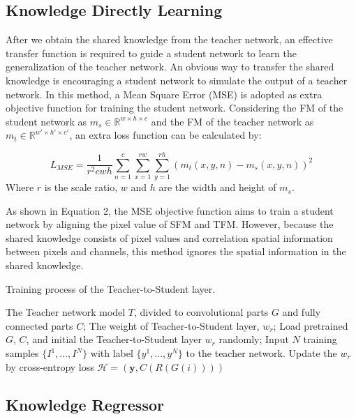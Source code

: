 \documentclass[letterpaper]{article} %
\begin{document}
\subsection{Knowledge Directly Learning}

After we obtain the shared knowledge from the teacher network, an effective transfer function is required to guide a student network to learn the generalization of the teacher network. An obvious way to transfer the shared knowledge is encouraging a student network to simulate the output of a teacher network. In this method, a Mean Square Error (MSE) is adopted as extra objective function for training the student network. Considering the FM of the student network as $m_{s}\in\mathbb{R}^{w\times h\times c}$ and the FM of the teacher network as $m_{t}\in\mathbb{R}^{w'\times h'\times c'}$, an extra loss function can be calculated by:

\begin{equation}
L_{MSE}=\frac{1}{r^2cwh}\sum_{n=1}^{c}\sum_{x=1}^{rw}\sum_{y=1}^{rh}(m_{t}(x,y,n)-m_{s}(x,y,n))^2
\end{equation}
Where $r$ is the scale ratio, $w$ and $h$ are the width and height of $m_{s}$.

As shown in Equation 2, the MSE objective function aims to train a student network by aligning the pixel value of SFM and TFM. However, because the shared knowledge consists of pixel values and correlation spatial information between pixels and channels, this method ignores the spatial information in the shared knowledge.

\begin{algorithm}[htb!]
	\caption{Training process of the Teacher-to-Student layer.}
	\begin{algorithmic}[1]
		\Require
		The Teacher network model $T$, divided to convolutional parts $G$ and fully connected parts $C$;
		\Ensure
		The weight of Teacher-to-Student layer, $w_r$;
		\State Load pretrained $G$, $C$, and initial the Teacher-to-Student layer $w_r$ randomly;
		\State Input $N$ training samples $\{I^{1},...,I^{N}\}$ with label $\{y^{1},...,y^{N}\}$ to the teacher network.
		\State Update the $w_r$ by cross-entropy loss $\mathcal{H}=(\textbf{y},C(R(G(i))))$
		\EndFor
	\end{algorithmic}
\end{algorithm}

\subsection{Knowledge Regressor}
\end{document}
